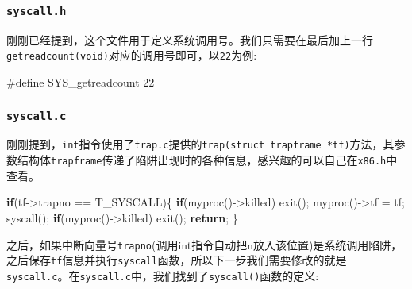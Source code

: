 \documentclass[
]{article}
\newenvironment{Shaded}{}{}
\newcommand{\ControlFlowTok}[1]{\textcolor[rgb]{0.00,0.44,0.13}{\textbf{#1}}}
\newcommand{\DecValTok}[1]{\textcolor[rgb]{0.25,0.63,0.44}{#1}}
\newcommand{\NormalTok}[1]{#1}
\newcommand{\OperatorTok}[1]{\textcolor[rgb]{0.40,0.40,0.40}{#1}}
\newcommand{\PreprocessorTok}[1]{\textcolor[rgb]{0.74,0.48,0.00}{#1}}
\begin{document}
\subsubsection{\texorpdfstring{\texttt{syscall.h}}{syscall.h}}\label{syscallh}

刚刚已经提到，这个文件用于定义系统调用号。我们只需要在最后加上一行\texttt{getreadcount(void)}对应的调用号即可，以\texttt{22}为例:

\begin{Shaded}
  \begin{Highlighting}[]
    \PreprocessorTok{\#define SYS\_getreadcount }\DecValTok{22}
  \end{Highlighting}
\end{Shaded}

\subsubsection{\texorpdfstring{\texttt{syscall.c}}{syscall.c}}\label{syscallc}

刚刚提到，\texttt{int}指令使用了\texttt{trap.c}提供的\texttt{trap(struct\ trapframe\ *tf)}方法，其参数结构体\texttt{trapframe}传递了陷阱出现时的各种信息，感兴趣的可以自己在\texttt{x86.h}中查看。

\begin{Shaded}
  \begin{Highlighting}[]
    \ControlFlowTok{if}\OperatorTok{(}\NormalTok{tf}\OperatorTok{{-}\textgreater{}}\NormalTok{trapno }\OperatorTok{==}\NormalTok{ T\_SYSCALL}\OperatorTok{)\{}
    \ControlFlowTok{if}\OperatorTok{(}\NormalTok{myproc}\OperatorTok{(){-}\textgreater{}}\NormalTok{killed}\OperatorTok{)}
    \NormalTok{    	exit}\OperatorTok{();}
    \NormalTok{  	myproc}\OperatorTok{(){-}\textgreater{}}\NormalTok{tf }\OperatorTok{=}\NormalTok{ tf}\OperatorTok{;}
    \NormalTok{  	syscall}\OperatorTok{();}
    \ControlFlowTok{if}\OperatorTok{(}\NormalTok{myproc}\OperatorTok{(){-}\textgreater{}}\NormalTok{killed}\OperatorTok{)}
    \NormalTok{    	exit}\OperatorTok{();}
    \ControlFlowTok{return}\OperatorTok{;}
    \OperatorTok{\}}
  \end{Highlighting}
\end{Shaded}

之后，如果中断向量号\texttt{trapno}(调用int指令自动把n放入该位置)是系统调用陷阱，之后保存\texttt{tf}信息并执行\texttt{syscall}函数，所以下一步我们需要修改的就是\texttt{syscall.c}。在\texttt{syscall.c}中，我们找到了\texttt{syscall()}函数的定义:
\end{document}
